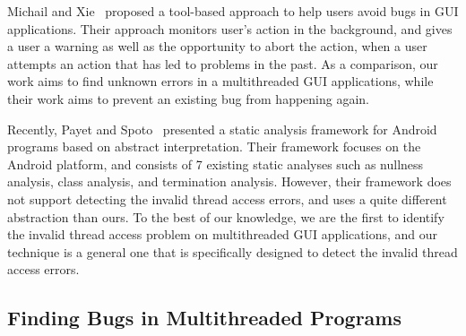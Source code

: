 Michail and Xie~\cite{michail05:helping} proposed a tool-based approach to help users avoid bugs
in GUI applications. Their approach monitors user's action in the background,
and gives a user a warning as well as the opportunity to abort the action, when
a user attempts an action that has led to problems in the past. 
As a comparison, our work aims to find unknown errors in a multithreaded
GUI applications, while their work aims to prevent an existing bug
from happening again.


Recently, Payet and Spoto~\cite{Payet:2011:SAA:2032266.2032299} presented a static
analysis framework for Android programs based on  abstract
interpretation. Their framework focuses on the Android platform, and
 consists of 7 existing static analyses such as
nullness analysis, class analysis, and termination analysis.  However,
their framework does not support detecting the invalid thread access
errors, and uses a quite different abstraction than ours.
To the best of our knowledge, we are the first to identify the invalid
thread access problem on multithreaded GUI applications, and
our technique is a general one that is specifically designed to detect
the invalid thread access errors.


\subsection{Finding Bugs in Multithreaded Programs}



